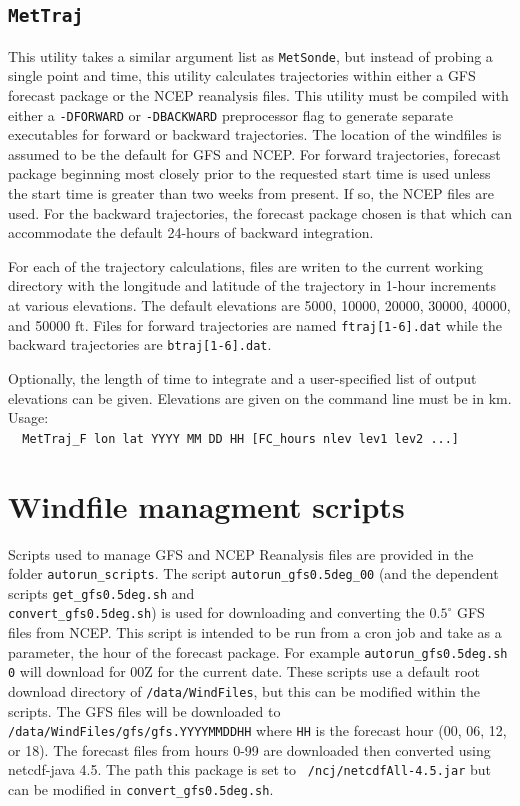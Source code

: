 \documentclass[11pt]{article}   %
\begin{document}
\subsection{\texttt{MetTraj}}
This utility takes a similar argument list as \texttt{MetSonde}, but instead of
probing a single point and time, this utility calculates trajectories within
either a GFS forecast package or the NCEP reanalysis files.
This utility must be compiled with either a \texttt{-DFORWARD} or \texttt{-DBACKWARD}
preprocessor flag to generate separate executables for forward or backward trajectories.
The location of the windfiles is assumed to be the default for GFS and NCEP.  For 
forward trajectories, forecast package beginning most closely prior to the requested
start time is used unless the start time is greater than two weeks from present.  If
so, the NCEP files are used.  For the backward trajectories, the forecast package
chosen is that which can accommodate the default 24-hours of backward integration.

For each of the trajectory calculations, files are writen to the current working directory
with the longitude and latitude of the trajectory in 1-hour increments at various
elevations.  The default elevations are 5000, 10000, 20000, 30000, 40000, and
50000 $\mathrm{ft}$.  Files for forward trajectories are named \texttt{ftraj[1-6].dat}
while the backward trajectories are  \texttt{btraj[1-6].dat}.

Optionally, the length of time to integrate and a user-specified list of output
elevations can be given.  Elevations are given on the command line must be in
$\mathrm{km}$.
Usage:\\
\verb|  MetTraj_F lon lat YYYY MM DD HH [FC_hours nlev lev1 lev2 ...]|


\section{Windfile managment scripts}
Scripts used to manage GFS and NCEP Reanalysis files are provided in the
folder \texttt{autorun\_scripts}.
The script \texttt{autorun\_gfs0.5deg\_00} (and the dependent scripts
\texttt{get\_gfs0.5deg.sh} and\\
\texttt{convert\_gfs0.5deg.sh}) is used for downloading and
converting the $0.5^{\circ}$ GFS files from NCEP.  This script is intended to be
run from a cron job and take as a parameter, the hour of the forecast package.  For example
\texttt{autorun\_gfs0.5deg.sh 0} will download for 00Z for the current date.  These 
scripts use a default root download directory of \texttt{/data/WindFiles}, but this can
be modified within the scripts.  The GFS files will be downloaded to\\
\texttt{/data/WindFiles/gfs/gfs.YYYYMMDDHH} where \texttt{HH} is the forecast hour
(00, 06, 12, or 18).  The forecast files from hours 0-99 are downloaded then converted using
netcdf-java 4.5.  The path this package is set to \texttt{~/ncj/netcdfAll-4.5.jar} but can be
modified in \texttt{convert\_gfs0.5deg.sh}.
\end{document}
